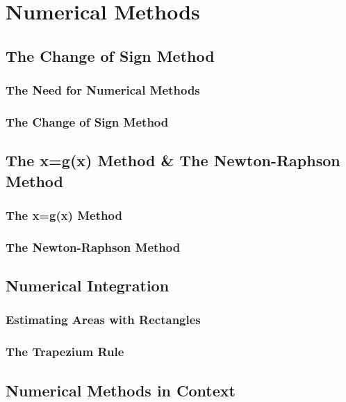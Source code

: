 \documentclass[../maths.tex]{subfiles}
\begin{document}
\chapter{Numerical Methods}
\section{The Change of Sign Method}
\subsection*{The Need for Numerical Methods}
\subsection*{The Change of Sign Method}
\section{The x=g(x) Method \& The Newton-Raphson Method}
\subsection*{The x=g(x) Method}
\subsection*{The Newton-Raphson Method}
\section{Numerical Integration}
\subsection*{Estimating Areas with Rectangles}
\subsection*{The Trapezium Rule}
\section{Numerical Methods in Context}
\end{document}
